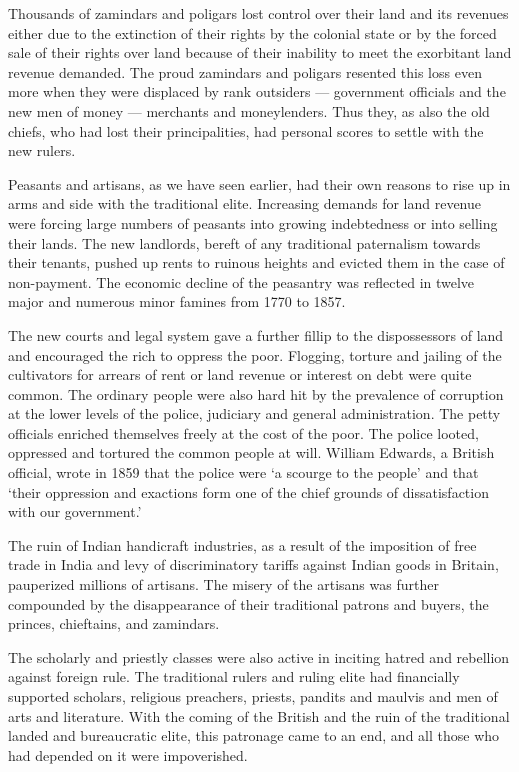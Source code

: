Thousands of zamindars and poligars lost control over their land and its revenues either due to the extinction of their rights by the colonial state or by the forced sale of their rights over land because of their inability to meet the exorbitant land revenue demanded. The proud zamindars and poligars resented this loss even more when they were displaced by rank outsiders — government officials and the new men of money — merchants and moneylenders. Thus they, as also the old chiefs, who had lost their principalities, had personal scores to settle with the new rulers.

Peasants and artisans, as we have seen earlier, had their own reasons to rise up in arms and side with the traditional elite. Increasing demands for land revenue were forcing large numbers of peasants into growing indebtedness or into selling their lands. The new landlords, bereft of any traditional paternalism towards their tenants, pushed up rents to ruinous heights and evicted them in the case of non-payment. The economic decline of the peasantry was reflected in twelve major and numerous minor famines from 1770 to 1857.

The new courts and legal system gave a further fillip to the dispossessors of land and encouraged the rich to oppress the poor. Flogging, torture and jailing of the cultivators for arrears of rent or land revenue or interest on debt were quite common. The ordinary people were also hard hit by the prevalence of corruption at the lower levels of the police, judiciary and general administration. The petty officials enriched themselves freely at the cost of the poor. The police looted, oppressed and tortured the common people at will. William Edwards, a British official, wrote in 1859 that the police were `a scourge to the people' and that `their oppression and exactions form one of the chief grounds of dissatisfaction with our government.'

The ruin of Indian handicraft industries, as a result of the imposition of free trade in India and levy of discriminatory tariffs against Indian goods in Britain, pauperized millions of artisans. The misery of the artisans was further compounded by the disappearance of their traditional patrons and buyers, the princes, chieftains, and zamindars.

The scholarly and priestly classes were also active in inciting hatred and rebellion against foreign rule. The traditional rulers and ruling elite had financially supported scholars, religious preachers, priests, pandits and maulvis and men of arts and literature. With the coming of the British and the ruin of the traditional landed and bureaucratic elite, this patronage came to an end, and all those who had depended on it were impoverished.

